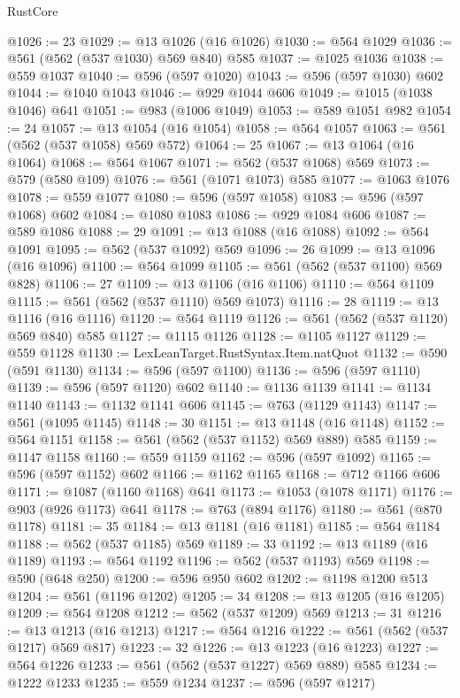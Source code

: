 \begin{lexlean}{RustCore}
\begin{coremodule}
@1026 := 23
@1029 := @13 @1026 (@16 @1026)
@1030 := @564 @1029
@1036 := @561 (@562 (@537 @1030) @569 @840) @585
@1037 := @1025 @1036
@1038 := @559 @1037
@1040 := @596 (@597 @1020)
@1043 := @596 (@597 @1030) @602
@1044 := @1040 @1043
@1046 := @929 @1044 @606
@1049 := @1015 (@1038 @1046) @641
@1051 := @983 (@1006 @1049)
@1053 := @589 @1051 @982
@1054 := 24
@1057 := @13 @1054 (@16 @1054)
@1058 := @564 @1057
@1063 := @561 (@562 (@537 @1058) @569 @572)
@1064 := 25
@1067 := @13 @1064 (@16 @1064)
@1068 := @564 @1067
@1071 := @562 (@537 @1068) @569
@1073 := @579 (@580 @109)
@1076 := @561 (@1071 @1073) @585
@1077 := @1063 @1076
@1078 := @559 @1077
@1080 := @596 (@597 @1058)
@1083 := @596 (@597 @1068) @602
@1084 := @1080 @1083
@1086 := @929 @1084 @606
@1087 := @589 @1086
@1088 := 29
@1091 := @13 @1088 (@16 @1088)
@1092 := @564 @1091
@1095 := @562 (@537 @1092) @569
@1096 := 26
@1099 := @13 @1096 (@16 @1096)
@1100 := @564 @1099
@1105 := @561 (@562 (@537 @1100) @569 @828)
@1106 := 27
@1109 := @13 @1106 (@16 @1106)
@1110 := @564 @1109
@1115 := @561 (@562 (@537 @1110) @569 @1073)
@1116 := 28
@1119 := @13 @1116 (@16 @1116)
@1120 := @564 @1119
@1126 := @561 (@562 (@537 @1120) @569 @840) @585
@1127 := @1115 @1126
@1128 := @1105 @1127
@1129 := @559 @1128
@1130 := LexLeanTarget.RustSyntax.Item.natQuot
@1132 := @590 (@591 @1130)
@1134 := @596 (@597 @1100)
@1136 := @596 (@597 @1110)
@1139 := @596 (@597 @1120) @602
@1140 := @1136 @1139
@1141 := @1134 @1140
@1143 := @1132 @1141 @606
@1145 := @763 (@1129 @1143)
@1147 := @561 (@1095 @1145)
@1148 := 30
@1151 := @13 @1148 (@16 @1148)
@1152 := @564 @1151
@1158 := @561 (@562 (@537 @1152) @569 @889) @585
@1159 := @1147 @1158
@1160 := @559 @1159
@1162 := @596 (@597 @1092)
@1165 := @596 (@597 @1152) @602
@1166 := @1162 @1165
@1168 := @712 @1166 @606
@1171 := @1087 (@1160 @1168) @641
@1173 := @1053 (@1078 @1171)
@1176 := @903 (@926 @1173) @641
@1178 := @763 (@894 @1176)
@1180 := @561 (@870 @1178)
@1181 := 35
@1184 := @13 @1181 (@16 @1181)
@1185 := @564 @1184
@1188 := @562 (@537 @1185) @569
@1189 := 33
@1192 := @13 @1189 (@16 @1189)
@1193 := @564 @1192
@1196 := @562 (@537 @1193) @569
@1198 := @590 (@648 @250)
@1200 := @596 @950 @602
@1202 := @1198 @1200 @513
@1204 := @561 (@1196 @1202)
@1205 := 34
@1208 := @13 @1205 (@16 @1205)
@1209 := @564 @1208
@1212 := @562 (@537 @1209) @569
@1213 := 31
@1216 := @13 @1213 (@16 @1213)
@1217 := @564 @1216
@1222 := @561 (@562 (@537 @1217) @569 @817)
@1223 := 32
@1226 := @13 @1223 (@16 @1223)
@1227 := @564 @1226
@1233 := @561 (@562 (@537 @1227) @569 @889) @585
@1234 := @1222 @1233
@1235 := @559 @1234
@1237 := @596 (@597 @1217)

\end{coremodule}
\end{lexlean}
